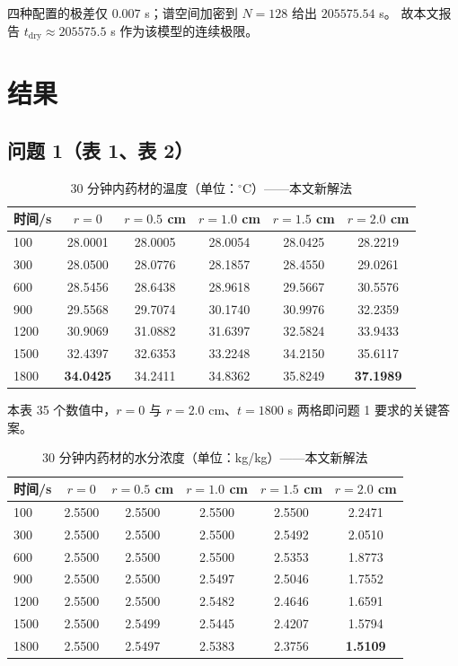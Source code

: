 \documentclass[11pt,a4paper]{article}
\theoremstyle{definition}
\begin{document}
四种配置的极差仅 $0.007$ s；谱空间加密到 $N=128$ 给出 $205575.54$ s。
故本文报告 $t_{\text{dry}}\approx205575.5$ s 作为该模型的连续极限。

\section{结果}

\subsection{问题 1（表 1、表 2）}

\begin{table}[H]
\centering
\small
\caption{30 分钟内药材的温度（单位：$^\circ$C）——本文新解法}
\begin{tabular}{@{}lccccc@{}}
\toprule
时间/s & $r=0$ & $r=0.5$ cm & $r=1.0$ cm & $r=1.5$ cm & $r=2.0$ cm \\
\midrule
100  & 28.0001 & 28.0005 & 28.0054 & 28.0425 & 28.2219 \\
300  & 28.0500 & 28.0776 & 28.1857 & 28.4550 & 29.0261 \\
600  & 28.5456 & 28.6438 & 28.9618 & 29.5667 & 30.5576 \\
900  & 29.5568 & 29.7074 & 30.1740 & 30.9976 & 32.2359 \\
1200 & 30.9069 & 31.0882 & 31.6397 & 32.5824 & 33.9433 \\
1500 & 32.4397 & 32.6353 & 33.2248 & 34.2150 & 35.6117 \\
1800 & \textbf{34.0425} & 34.2411 & 34.8362 & 35.8249 & \textbf{37.1989} \\
\bottomrule
\end{tabular}
\end{table}

本表 35 个数值中，$r=0$ 与 $r=2.0$ cm、$t=1800$ s 两格即问题 1 要求的关键答案。

\begin{table}[H]
\centering
\small
\caption{30 分钟内药材的水分浓度（单位：kg/kg）——本文新解法}
\begin{tabular}{@{}lccccc@{}}
\toprule
时间/s & $r=0$ & $r=0.5$ cm & $r=1.0$ cm & $r=1.5$ cm & $r=2.0$ cm \\
\midrule
100  & 2.5500 & 2.5500 & 2.5500 & 2.5500 & 2.2471 \\
300  & 2.5500 & 2.5500 & 2.5500 & 2.5492 & 2.0510 \\
600  & 2.5500 & 2.5500 & 2.5500 & 2.5353 & 1.8773 \\
900  & 2.5500 & 2.5500 & 2.5497 & 2.5046 & 1.7552 \\
1200 & 2.5500 & 2.5500 & 2.5482 & 2.4646 & 1.6591 \\
1500 & 2.5500 & 2.5499 & 2.5445 & 2.4207 & 1.5794 \\
1800 & 2.5500 & 2.5497 & 2.5383 & 2.3756 & \textbf{1.5109} \\
\bottomrule
\end{tabular}
\end{table}
\end{document}
